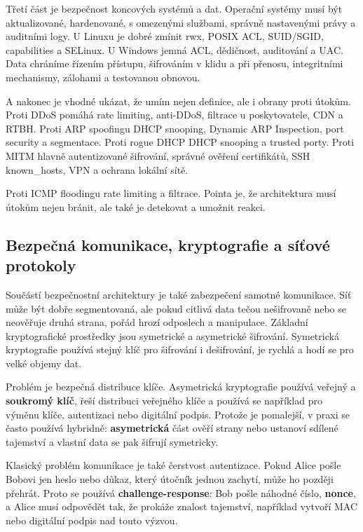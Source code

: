 Třetí část je bezpečnost koncových systémů a dat. Operační systémy musí být aktualizované, hardenované, s omezenými službami, správně nastavenými právy a auditními logy. U Linuxu je dobré zmínit rwx, POSIX ACL, SUID/SGID, capabilities a SELinux. U Windows jemná ACL, dědičnost, auditování a UAC. Data chráníme řízením přístupu, šifrováním v klidu a při přenosu, integritními mechanismy, zálohami a testovanou obnovou.

A nakonec je vhodné ukázat, že umím nejen definice, ale i obrany proti útokům. Proti DDoS pomáhá rate limiting, anti-DDoS, filtrace u poskytovatele, CDN a RTBH. Proti ARP spoofingu DHCP snooping, Dynamic ARP Inspection, port security a segmentace. Proti rogue DHCP DHCP snooping a trusted porty. Proti MITM hlavně autentizované šifrování, správné ověření certifikátů, SSH known\_hosts, VPN a ochrana lokální sítě.

Proti ICMP floodingu rate limiting a filtrace. Pointa je, že architektura musí útokům nejen bránit, ale také je detekovat a umožnit reakci.

\subsection*{Bezpečná komunikace, kryptografie a síťové protokoly}

Součástí bezpečnostní architektury je také zabezpečení samotné komunikace. Síť může být dobře segmentovaná, ale pokud citlivá data tečou nešifrovaně nebo se neověřuje druhá strana, pořád hrozí odposlech a manipulace. Základní kryptografické prostředky jsou symetrické a asymetrické šifrování. Symetrická kryptografie používá stejný klíč pro šifrování i dešifrování, je rychlá a hodí se pro velké objemy dat.

Problém je bezpečná distribuce klíče. Asymetrická kryptografie používá veřejný a \textbf{soukromý klíč}, řeší distribuci veřejného klíče a používá se například pro výměnu klíče, autentizaci nebo digitální podpis. Protože je pomalejší, v praxi se často používá hybridně: \textbf{asymetrická} část ověří strany nebo ustanoví sdílené tajemství a vlastní data se pak šifrují symetricky.

Klasický problém komunikace je také čerstvost autentizace. Pokud Alice pošle Bobovi jen heslo nebo důkaz, který útočník jednou zachytí, může ho později přehrát. Proto se používá \textbf{challenge-response}: Bob pošle náhodné číslo, \textbf{nonce}, a Alice musí odpovědět tak, že prokáže znalost tajemství, například vytvoří MAC nebo digitální podpis nad touto výzvou.

